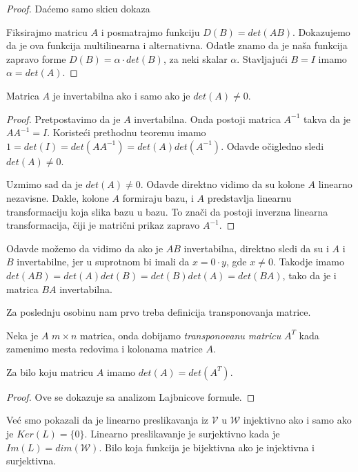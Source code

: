 \documentclass{article}
\begin{document}
\begin{proof}
  Daćemo samo skicu dokaza

  Fiksirajmo matricu $A$ i posmatrajmo funkciju $D(B) = det(AB)$.
  Dokazujemo da je ova funkcija multilinearna i alternativna.
  Odatle znamo da je naša funkcija zapravo forme $D(B) = \alpha \cdot det(B)$, za neki skalar $\alpha$.
  Stavljajući $B = I$ imamo $\alpha = det(A)$.
\end{proof}

\begin{theorem}
  Matrica $A$ je invertabilna ako i samo ako je $det(A) \neq 0$.
\end{theorem}

\begin{proof}
  Pretpostavimo da je $A$ invertabilna.
  Onda postoji matrica $A^{-1}$ takva da je $AA^{-1} = I$.
  Koristeći prethodnu teoremu imamo $1 = det(I) = det(AA^{-1}) = det(A)det(A^{-1})$.
  Odavde očigledno sledi $det(A) \neq 0$.


  Uzmimo sad da je $det(A) \neq 0$.
  Odavde direktno vidimo da su kolone $A$ linearno nezavisne.
  Dakle, kolone $A$ formiraju bazu, i $A$ predstavlja linearnu transformaciju koja slika bazu u bazu.
  To znači da postoji inverzna linearna transformacija, čiji je matrični prikaz zapravo $A^{-1}$.
\end{proof}

Odavde možemo da vidimo da ako je $AB$ invertabilna, direktno sledi da su i $A$ i $B$ invertabilne, jer u suprotnom bi imali da $x = 0 \cdot y$, gde $x \neq 0$.
Takodje imamo $det(AB) = det(A)det(B) = det(B)det(A) = det(BA)$, tako da je i matrica $BA$ invertabilna.

Za poslednju osobinu nam prvo treba definicija transponovanja matrice.

\begin{definition}
  Neka je $A$ $m \times n$ matrica, onda dobijamo \textit{transponovanu matricu} $A^T$ kada zamenimo mesta redovima i kolonama matrice $A$.
\end{definition}

\begin{theorem}
  Za bilo koju matricu $A$ imamo $det(A) = det(A^T)$.
\end{theorem}

\begin{proof}
  Ove se dokazuje sa analizom Lajbnicove formule.
\end{proof}

Već smo pokazali da je linearno preslikavanja iz $\mathcal{V}$ u $\mathcal{W}$ injektivno ako i samo ako je $Ker(L) = \{0\}$.
Linearno preslikavanje je surjektivno kada je $Im(L) = dim(\mathcal{W})$.
Bilo koja funkcija je bijektivna ako je injektivna i surjektivna.
\end{document}
